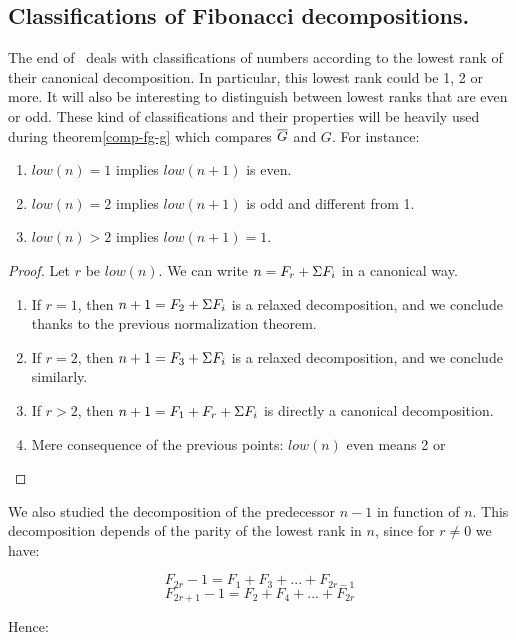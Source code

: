 \documentclass[a4paper,11pt]{article}
\begin{document}
\subsection{Classifications of Fibonacci decompositions.}
The end of \ deals with classifications of numbers
according to the lowest rank of their canonical decomposition.
In particular, this lowest rank could be 1, 2 or more. It will
also be interesting to distinguish between lowest ranks that
are even or odd. These kind of classifications and their
properties will be heavily used
during theorem\ref{comp-fg-g} which compares $\overline{G}$ and $G$.
For instance:
\begin{theorem}\label{fibsucc}
\noindent
\begin{enumerate}
\item $low(n) = 1$ implies $low(n+1)$ is even.
\item $low(n) = 2$ implies $low(n+1)$ is odd and different from 1.
\item $low(n) > 2$ implies $low(n+1) = 1$.
\end{enumerate}
\end{theorem}
\begin{proof}
Let $r$ be $low(n)$. We can write $n = F_r + \Sigma F_i$ in a canonical
way.
\begin{enumerate}
\item If $r = 1$, then $n+1 = F_2 + \Sigma F_i$ is a relaxed decomposition,
  and we conclude thanks to the previous normalization theorem.
\item If $r = 2$, then $n+1 = F_3 + \Sigma F_i$ is a relaxed decomposition,
  and we conclude similarly.
\item If $r > 2$, then $n+1 = F_1 + F_r + \Sigma F_i$ is directly a
  canonical decomposition.
\item Mere consequence of the previous points: $low(n)$ even
means 2 or 

\end{enumerate}
\end{proof}

We also studied the decomposition of the predecessor
$n-1$ in function of $n$. This decomposition depends of the parity of
the lowest rank in $n$, since for $r\neq 0$ we have:

$$ F_{2r} - 1 = F_1 + F_3 + ... + F_{2r-1}$$
$$ F_{2r+1} - 1 = F_2 + F_4 + ... + F_{2r}$$

Hence:
\end{document}
